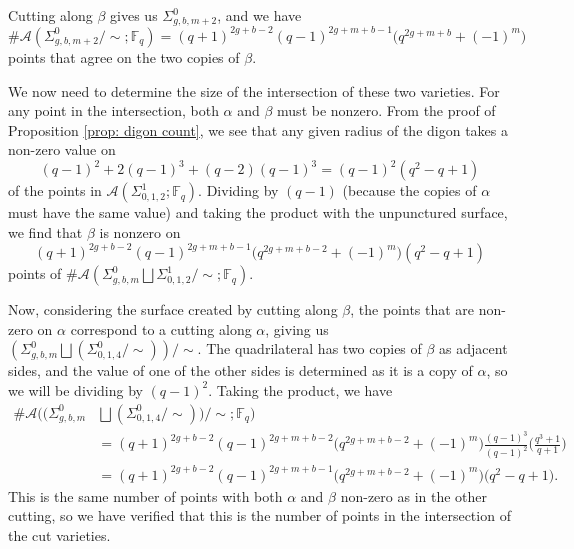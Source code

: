 \documentclass[reqno,12pt]{amsart}
\theoremstyle{definition}
\theoremstyle{remark}
\theoremstyle{remark}
\numberwithin{equation}{section}
\begin{document}
Cutting along $\beta$ gives us $\Sigma_{g,b,m+2}^0$, and we have 
\[ \#\mathcal{A}(\Sigma_{g,b,m+2}^{0} /\!\sim; \mathbb{F}_q) = (q+1)^{2g+b-2} (q-1)^{2g+m+b-1} \big(q^{2g+m+b} + (-1)^{m}\big) \] points that agree on the two copies of $\beta$. 

We now need to determine the size of the intersection of these two varieties. For any point in the intersection, both $\alpha$ and $\beta$ must be nonzero. From the proof of Proposition \ref{prop: digon count}, we see that any given radius of the digon takes a non-zero value on 
\[ (q-1)^2 + 2(q-1)^3 + (q-2)(q-1)^3 = (q-1)^2(q^2 - q + 1) \]
of the points in $\mathcal{A} (\Sigma_{0,1,2}^1; \mathbb{F}_q)$. Dividing by $(q-1)$ (because the copies of $\alpha$ must have the same value) and taking the product with the unpunctured surface, we find that $\beta$ is nonzero on 
\[ (q+1)^{2g+b-2} (q-1)^{2g+m+b-1} \big(q^{2g+m+b-2} + (-1)^{m}\big) (q^2 - q + 1) \] 
points of $ \#\mathcal{A}(\Sigma_{g,b,m}^{0} \bigsqcup \Sigma_{0,1,2}^1 /\!\sim; \mathbb{F}_q) $.

Now, considering the surface created by cutting along $\beta$, the points that are non-zero on $\alpha$ correspond to a cutting along $\alpha$, giving us $(\Sigma_{g,b,m}^0 \bigsqcup (\Sigma_{0,1,4}^0/\!\sim))/\!\sim$. The quadrilateral has two copies of $\beta$ as adjacent sides, and the value of one of the other sides is determined as it is a copy of $\alpha$, so we will be dividing by $(q-1)^2$. Taking the product, we have 
\begin{align*}
 \#\mathcal{A}((\Sigma_{g,b,m}^0 &\bigsqcup (\Sigma_{0,1,4}^0/\!\sim))/\!\sim; \mathbb{F}_q) \\
 &= (q+1)^{2g+b-2} (q-1)^{2g+m+b-2} \big(q^{2g+m+b-2} + (-1)^{m}\big) \frac{(q-1)^3}{(q-1)^2} \bigg( \frac{q^3 + 1}{q+1} \bigg) \\
 &= (q+1)^{2g+b-2} (q-1)^{2g+m+b-1} \big(q^{2g+m+b-2} + (-1)^{m}\big)  \big( q^2 - q + 1 \big).
\end{align*}
This is the same number of points with both $\alpha$ and $\beta$ non-zero as in the other cutting, so we have verified that this is the number of points in the intersection of the cut varieties.
\end{document}
